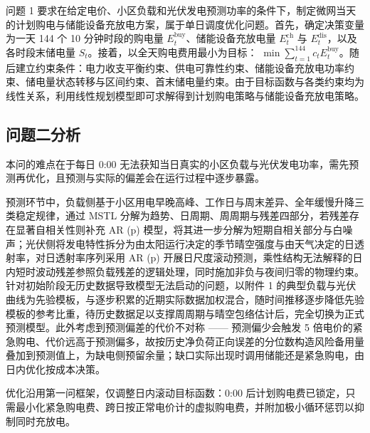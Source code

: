 \documentclass[withoutpreface,bwprint]{cumcmthesis}
\begin{document}
问题 1 要求在给定电价、小区负载和光伏发电预测功率的条件下，制定微网当天的计划购电与储能设备充放电方案，属于单日调度优化问题。首先，确定决策变量为一天 144 个 10 分钟时段的购电量 \(E^{\mathrm{buy}}_t\)、储能设备充放电量 \(E^{\mathrm{ch}}_t\) 与 \(E^{\mathrm{dis}}_t\)，以及各时段末储电量 \(S_t\)。接着，以全天购电费用最小为目标： \(\min \sum_{t=1}^{144} c_t E^{\mathrm{buy}}_t\)。随后建立约束条件：电力收支平衡约束、供电可靠性约束、储能设备充放电功率约束、储电量状态转移与区间约束、首末储电量约束。由于目标函数与各类约束均为线性关系，利用线性规划模型即可求解得到计划购电策略与储能设备充放电策略。



\vspace*{-20pt}
\subsection{问题二分析}	


本问的难点在于每日 0:00 无法获知当日真实的小区负载与光伏发电功率，需先预测再优化，且预测与实际的偏差会在运行过程中逐步暴露。

预测环节中，负载侧基于小区用电早晚高峰、工作日与周末差异、全年缓慢升降三类稳定规律，通过 MSTL 分解为趋势、日周期、周周期与残差四部分，若残差存在显著自相关性则补充 AR (p) 模型，将其进一步分解为短期自相关部分与白噪声；光伏侧将发电特性拆分为由太阳运行决定的季节晴空强度与由天气决定的日透射率，对日透射率序列采用 AR (p) 开展日尺度滚动预测，乘性结构无法解释的日内短时波动残差参照负载残差的逻辑处理，同时施加非负与夜间归零的物理约束。针对初始阶段无历史数据导致模型无法启动的问题，以附件 1 的典型负载与光伏曲线为先验模板，与逐步积累的近期实际数据加权混合，随时间推移逐步降低先验模板的参考比重，待历史数据足以支撑周周期与晴空包络估计后，完全切换为正式预测模型。此外考虑到预测偏差的代价不对称 —— 预测偏少会触发 5 倍电价的紧急购电、代价远高于预测偏多，故按历史净负荷正向误差的分位数构造风险备用量叠加到预测值上，为缺电侧预留余量；缺口实际出现时调用储能还是紧急购电，由日内优化按成本决策。

优化沿用第一问框架，仅调整日内滚动目标函数：0:00 后计划购电费已锁定，只需最小化紧急购电费、跨日按正常电价计的虚拟购电费，并附加极小循环惩罚以抑制同时充放电。
\end{document}
